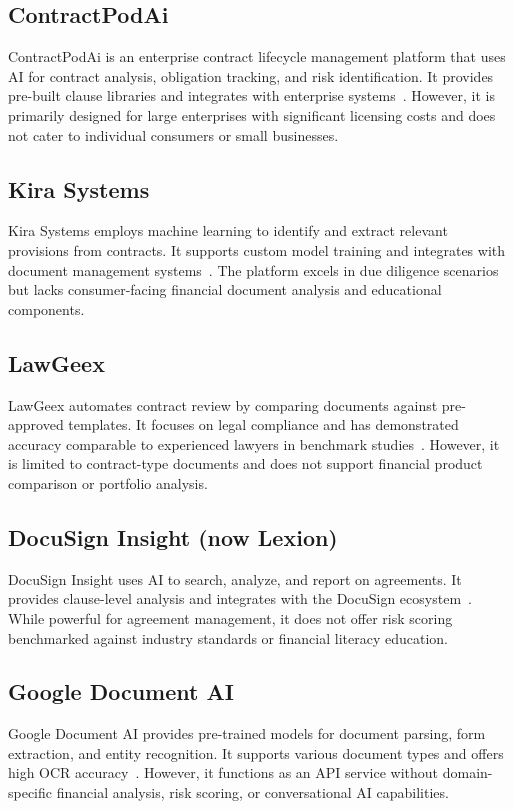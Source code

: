 \documentclass[12pt,a4paper,oneside]{report}
\begin{document}
\subsection{ContractPodAi}
ContractPodAi is an enterprise contract lifecycle management platform that uses AI for contract analysis, obligation tracking, and risk identification. It provides pre-built clause libraries and integrates with enterprise systems~\cite{ref7}. However, it is primarily designed for large enterprises with significant licensing costs and does not cater to individual consumers or small businesses.

\subsection{Kira Systems}
Kira Systems employs machine learning to identify and extract relevant provisions from contracts. It supports custom model training and integrates with document management systems~\cite{ref8}. The platform excels in due diligence scenarios but lacks consumer-facing financial document analysis and educational components.

\subsection{LawGeex}
LawGeex automates contract review by comparing documents against pre-approved templates. It focuses on legal compliance and has demonstrated accuracy comparable to experienced lawyers in benchmark studies~\cite{ref9}. However, it is limited to contract-type documents and does not support financial product comparison or portfolio analysis.

\subsection{DocuSign Insight (now Lexion)}
DocuSign Insight uses AI to search, analyze, and report on agreements. It provides clause-level analysis and integrates with the DocuSign ecosystem~\cite{ref10}. While powerful for agreement management, it does not offer risk scoring benchmarked against industry standards or financial literacy education.

\subsection{Google Document AI}
Google Document AI provides pre-trained models for document parsing, form extraction, and entity recognition. It supports various document types and offers high OCR accuracy~\cite{ref11}. However, it functions as an API service without domain-specific financial analysis, risk scoring, or conversational AI capabilities.
\end{document}
